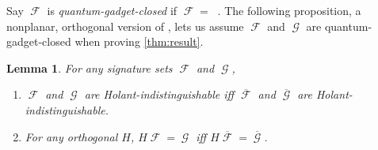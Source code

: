 \documentclass{article}
\newtheorem{lemma}{Lemma}[section]
\theoremstyle{remark}
\theoremstyle{definition}
\DeclareMathOperator{\fc}{\mathcal{F}}
\DeclareMathOperator{\gc}{\mathcal{G}}
\DeclareMathOperator{\ofc}{\overline{\fc}}
\begin{document}
Say $\fc$ is \emph{quantum-gadget-closed} if $\fc = \ofc$. The following proposition, a
nonplanar, orthogonal version of \cite[Lemmas 31 and 32]{cai_planar_2023}, lets us assume
$\fc$ and $\gc$ are quantum-gadget-closed when proving \autoref{thm:result}.
\begin{lemma}
    \label{prop:closure}
    For any signature sets $\fc$ and $\gc$,
    \begin{enumerate}
        \item $\fc$ and $\gc$ are Holant-indistinguishable iff $\overline{\fc}$ and $\overline{\gc}$ are
            Holant-indistinguishable.
        \item For any orthogonal $H$, $H\fc = \gc$ iff $H\overline{\fc} = \overline{\gc}$.
    \end{enumerate}
\end{lemma}
\end{document}
